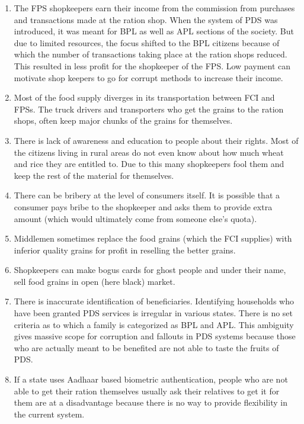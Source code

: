 \documentclass{article}
\begin{document}
\begin{enumerate}
  \item The FPS shopkeepers earn their income from the commission from purchases and transactions made at the ration shop. When the system of PDS was introduced, it was meant for BPL as well as APL sections of the society. But due to limited resources, the focus shifted to the BPL citizens because of which the number of transactions taking place at the ration shops reduced. This resulted in less profit for the shopkeeper of the FPS. Low payment can motivate shop keepers to go for corrupt methods to increase their income.
  \item Most of the food supply diverges in its transportation between FCI and FPSs. The truck drivers and transporters who get the grains to the ration shops, often keep major chunks of the grains for themselves.
  \item There is lack of awareness and education to people about their rights. Most of the citizens living in rural areas do not even know about how much wheat and rice they are entitled to. Due to this many shopkeepers fool them and keep the rest of the material for themselves.
  \item There can be bribery at the level of consumers itself. It is possible that a consumer pays bribe to the shopkeeper and asks them to provide extra amount (which would ultimately come from someone else's quota).
  \item Middlemen sometimes replace the food grains (which the FCI supplies) with inferior quality grains for profit in reselling the better grains.
  \item Shopkeepers can make bogus cards for ghost people and under their name, sell food grains in open (here black) market.
  \item There is inaccurate identification of beneficiaries. Identifying households who have been granted PDS services is irregular in various states. There is no set criteria as to which a family is categorized as BPL and APL. This ambiguity gives massive scope for corruption and fallouts in PDS systems because those who are actually meant to be benefited are not able to taste the fruits of PDS.
  \item If a state uses Aadhaar based biometric authentication, people who are not able to get their ration themselves usually ask their relatives to get it for them are at a disadvantage because there is no way to provide flexibility in the current system.
\end{enumerate}
\end{document}
